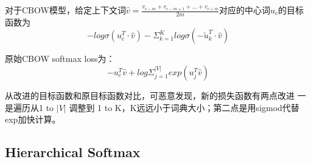 \documentclass[twoside,nofonts,fancyhdr,openany,UTF8]{ctexbook}
\begin{document}
对于CBOW模型，给定上下文词$\widehat{v}=\frac{v_{c-m}+v_{c-m+1}+...+v_{c+m}}{2m}$对应的中心词$u_c$的目标函数为
$$-log\sigma{(u_{c}^{T}\cdot{\widehat{v}})}-\Sigma_{k=1}^{K}log\sigma{(-\widetilde{u}_{k}^{T}\cdot{\widehat{v}})}$$

原始CBOW softmax loss为：
$$-u_{c}^{T}\widehat{v}+log\Sigma_{j=1}^{|V|}exp{(u_{j}^{T}\widehat{v})} $$

从改进的目标函数和原目标函数对比，可恶意发现，新的损失函数有两点改进 一是遍历从1 to $|V|$ 调整到 1 to K，K远远小于词典大小；第二点是用sigmod代替exp加快计算。
\subsection{Hierarchical Softmax}
\end{document}
